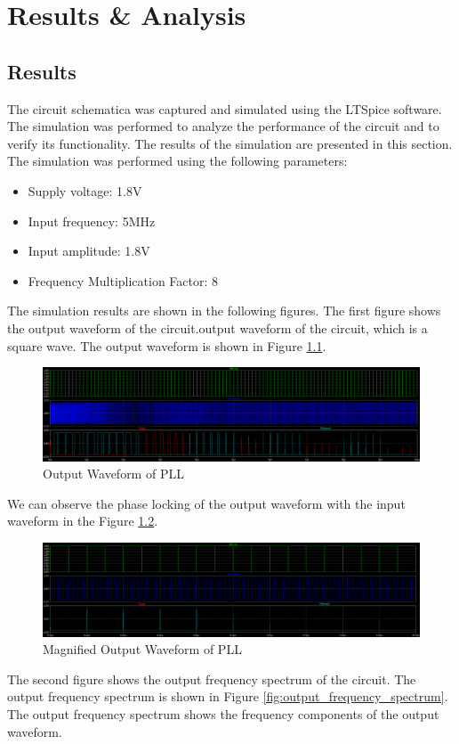 \chapter{Results \& Analysis}
\label{chapter:results}
\section{Results}
The circuit schematica was captured and simulated using the LTSpice software. The simulation was performed to analyze the performance of the circuit and to verify its functionality. The results of the simulation are presented in this section.
The simulation was performed using the following parameters:
\begin{itemize}
    \item Supply voltage: 1.8V
    \item Input frequency: 5MHz
    \item Input amplitude: 1.8V
    \item Frequency Multiplication Factor: 8
\end{itemize}
The simulation results are shown in the following figures. The first figure shows the 
output waveform of the circuit.output waveform of the circuit, which is a square wave. The output waveform is shown in Figure \ref{fig:output_waveform}.
\begin{figure}[H]
    \centering
    \includegraphics[width=1\textwidth]{figs/finalop5MHz.png}
    \caption{Output Waveform of PLL}
    \label{fig:output_waveform}
    \vspace{0.5cm}
\end{figure}
We can observe the phase locking of the output waveform with the input waveform in the Figure \ref{fig:output_waveform_phaselocking}.
\begin{figure}[H]
    \centering
    \includegraphics[width=1\textwidth]{figs/finalopphaselock.png}
    \caption{Magnified Output Waveform of PLL}
    \label{fig:output_waveform_phaselocking}
    \vspace{0.5cm}
\end{figure}
The second figure shows the output frequency spectrum of the circuit. The output frequency spectrum is shown in Figure \ref{fig:output_frequency_spectrum}. The output frequency spectrum shows the frequency components of the output waveform.

